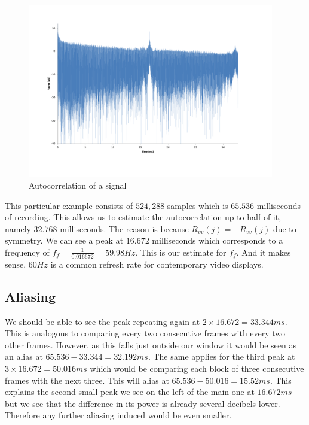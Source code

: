 \documentclass[a4paper,12pt,twoside,openright]{report}
\begin{document}
\begin{figure}[h]
\centering
  \includegraphics[width=0.96\textwidth]{autocorr}
  \caption{Autocorrelation of a signal}
  \label{fig:autocorr}
\end{figure}

This particular example consists of $524,288$ samples which is $65.536$ milliseconds of recording. This allows us to estimate the autocorrelation up to half of it, namely $32.768$ milliseconds. The reason is because $R_{vv}(j)=-R_{vv}(j)$ due to symmetry. We can see a peak at $16.672$ milliseconds which corresponds to a frequency of $f_{f} = \frac{1}{0.016672} = 59.98 Hz$. This is our estimate for $f_{f}$. And it makes sense, $60 Hz$ is a common refresh rate for contemporary video displays.

\subsection{Aliasing}
We should be able to see the peak repeating again at $2 \times 16.672 = 33.344 ms$. This is analogous to comparing every two consecutive frames with every two other frames. However, as this falls just outside our window it would be seen as an alias at $65.536-33.344 = 32.192 ms$. The same applies for the third peak at $3 \times 16.672 = 50.016 ms$ which would be comparing each block of three consecutive frames with the next three. This will alias at $65.536 - 50.016 = 15.52 ms$. This explains the second small peak we see on the left of the main one at $16.672 ms$ but we see that the difference in its power is already several decibels lower. Therefore any further aliasing induced would be even smaller.
\end{document}
